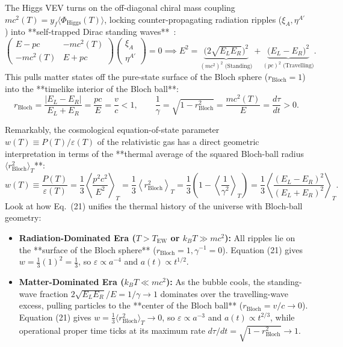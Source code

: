 \documentclass[11pt,a4paper]{article}
\begin{document}
The Higgs VEV turns on the off-diagonal chiral mass coupling $mc^2(T) = y_f \langle\Phi_{\text{Higgs}}(T)\rangle$, locking counter-propagating radiation ripples ($\xi_A, \eta^{A'}$) into **self-trapped Dirac standing waves**~\cite{Dirac1928,PenroseRoad2004}:
\begin{equation}
\begin{pmatrix} E - pc & -mc^2(T) \\ -mc^2(T) & E + pc \end{pmatrix} \begin{pmatrix} \xi_A \\ \eta^{A'} \end{pmatrix} = 0 \implies E^2 = \underbrace{\big(2\sqrt{E_L E_R}\big)^2}_{(mc^2)^2\text{ (Standing)}} + \underbrace{\big(E_L - E_R\big)^2}_{(pc)^2\text{ (Travelling)}}.
\end{equation}
This pulls matter states off the pure-state surface of the Bloch sphere ($r_{\text{Bloch}} = 1$) into the **timelike interior of the Bloch ball**:
\begin{equation}
r_{\text{Bloch}} = \frac{|E_L - E_R|}{E_L + E_R} = \frac{pc}{E} = \frac{v}{c} < 1, \qquad \frac{1}{\gamma} = \sqrt{1 - r_{\text{Bloch}}^2} = \frac{mc^2(T)}{E} = \frac{d\tau}{dt} > 0.
\end{equation}

Remarkably, the cosmological equation-of-state parameter $w(T) \equiv P(T) / \varepsilon(T)$ of the relativistic gas has a direct geometric interpretation in terms of the **thermal average of the squared Bloch-ball radius $\langle r_{\text{Bloch}}^2\rangle_T$**:
\begin{equation}
w(T) \equiv \frac{P(T)}{\varepsilon(T)} = \frac{1}{3}\left\langle \frac{p^2 c^2}{E^2} \right\rangle_{\!T} = \frac{1}{3}\left\langle r_{\text{Bloch}}^2 \right\rangle_{\!T} = \frac{1}{3}\left( 1 - \left\langle \frac{1}{\gamma^2} \right\rangle_{\!T} \right) = \frac{1}{3}\left\langle \frac{(E_L - E_R)^2}{(E_L + E_R)^2} \right\rangle_{\!T}.
\end{equation}
Look at how Eq.\ (21) unifies the thermal history of the universe with Bloch-ball geometry:
\begin{itemize}
    \item \textbf{Radiation-Dominated Era ($T > T_{\text{EW}}$ or $k_B T \gg mc^2$):} All ripples lie on the **surface of the Bloch sphere** ($r_{\text{Bloch}} = 1, \gamma^{-1} = 0$). Equation (21) gives $w = \frac{1}{3}(1)^2 = \frac{1}{3}$, so $\varepsilon \propto a^{-4}$ and $a(t) \propto t^{1/2}$.
    \item \textbf{Matter-Dominated Era ($k_B T \ll mc^2$):} As the bubble cools, the standing-wave fraction $2\sqrt{E_L E_R}/E = 1/\gamma \to 1$ dominates over the travelling-wave excess, pulling particles to the **center of the Bloch ball** ($r_{\text{Bloch}} = v/c \to 0$). Equation (21) gives $w = \frac{1}{3}\langle r_{\text{Bloch}}^2\rangle_T \to 0$, so $\varepsilon \propto a^{-3}$ and $a(t) \propto t^{2/3}$, while operational proper time ticks at its maximum rate $d\tau/dt = \sqrt{1 - r_{\text{Bloch}}^2} \to 1$.
\end{itemize}
\end{document}
